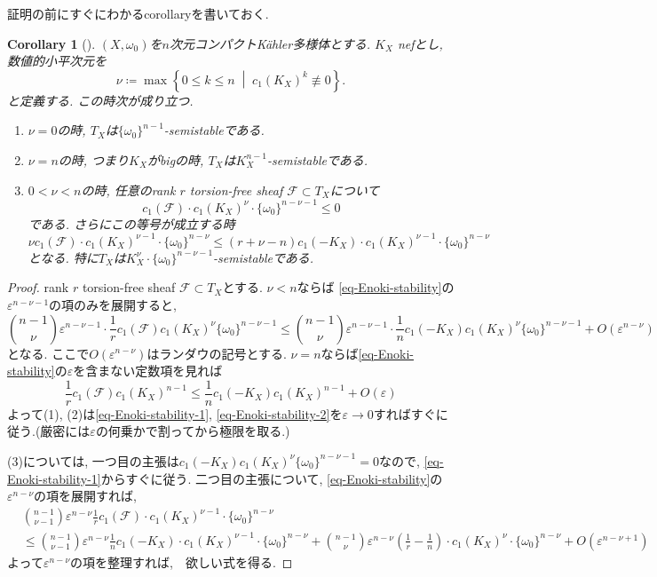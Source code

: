 \documentclass[dvipdfmx,a4paper,11pt]{article} %
\newtheorem{cor}[thm]{Corollary}
\theoremstyle{definition}
\theoremstyle{remark}
\numberwithin{equation}{section}
\begin{document}
証明の前にすぐにわかるcorollaryを書いておく.
\begin{cor}[{\cite[Corollary 1.2, 1.3]{Eno88}}]
$(X, \omega_0)$を$n$次元コンパクトK\"ahler多様体とする. $K_X$ nefとし, 数値的小平次元を
\[
\nu \coloneqq  \max \left\{ 0 \leq k \leq n\;\middle\vert\; c_1(K_X)^k \not \equiv 0 \right\}.
\]
と定義する. この時次が成り立つ.
\begin{enumerate}
\item $\nu=0$の時, $T_X$は$\{\omega_0\}^{n-1}$-semistableである. 
\item  $\nu=n$の時, つまり$K_X$がbigの時, $T_X$は$K_X^{n-1}$-semistableである. 
\item $0<\nu<n$の時, 任意のrank $r$ torsion-free sheaf $\mathcal{F} \subset T_X$について
\[
c_1(\mathcal{F}) \cdot c_1(K_X)^{\nu} \cdot \{ \omega_0\}^{n-\nu-1}
\leq 0
\]
である. さらにこの等号が成立する時
\[
\nu  c_1(\mathcal{F}) \cdot c_1(K_X)^{\nu-1} \cdot \{ \omega_0\}^{n-\nu}
\leq 
(r+\nu - n)
c_1(-K_X) \cdot c_1(K_X)^{\nu-1} \cdot \{ \omega_0\}^{n-\nu}
\]
となる. 
特に$T_X$は$K_X^{\nu}\cdot \{ \omega_0\}^{n-\nu-1}$-semistableである. 
\end{enumerate}
\end{cor}
\begin{proof}
rank $r$ torsion-free sheaf $\mathcal{F} \subset T_X$とする. 
$\nu <n$ならば 
 \eqref{eq-Enoki-stability}の$\varepsilon^{n-\nu-1}$の項のみを展開すると,
\begin{equation}
\label{eq-Enoki-stability-1}
\binom{n-1}{\nu}\varepsilon^{n-\nu-1}
\cdot 
\frac{1}{r}
c_1(\mathcal{F}) 
c_1(K_X)^{\nu}
\{ \omega_0\}^{n-\nu-1}
\leq
\binom{n-1}{\nu}\varepsilon^{n-\nu-1}
\cdot 
\frac{1}{n}
c_1(-K_X) c_1(K_X)^{\nu}
\{ \omega_0\}^{n-\nu-1}
+O(\varepsilon^{n-\nu})
\end{equation}
となる. ここで$O(\varepsilon^{n-\nu})$はランダウの記号とする. 
$\nu =n$ならば\eqref{eq-Enoki-stability}の$\varepsilon$を含まない定数項を見れば
\begin{equation}
\label{eq-Enoki-stability-2}
\frac{1}{r}
c_1(\mathcal{F}) 
c_1(K_X)^{n-1}
\leq
\frac{1}{n}
c_1(-K_X) c_1(K_X)^{n-1}
+O(\varepsilon)
\end{equation}
よって(1), (2)は\eqref{eq-Enoki-stability-1}, \eqref{eq-Enoki-stability-2}を$\varepsilon \to 0$すればすぐに従う.(厳密には$\varepsilon$の何乗かで割ってから極限を取る.)

(3)については,  一つ目の主張は$c_1(-K_X) c_1(K_X)^{\nu}
\{ \omega_0\}^{n-\nu-1}=0$なので, \eqref{eq-Enoki-stability-1}からすぐに従う. 
二つ目の主張について, \eqref{eq-Enoki-stability}の$\varepsilon^{n-\nu}$の項を展開すれば, 
\begin{align*}
&
\binom{n-1}{\nu-1}\varepsilon^{n-\nu}
\frac{1}{r}
 c_1(\mathcal{F}) \cdot c_1(K_X)^{\nu-1} \cdot \{ \omega_0\}^{n-\nu}
\\
&\leq
\binom{n-1}{\nu-1}\varepsilon^{n-\nu}\frac{1}{n}
c_1(-K_X) \cdot c_1(K_X)^{\nu-1} \cdot \{ \omega_0\}^{n-\nu}
+
\binom{n-1}{\nu}\varepsilon^{n-\nu}
\left( \frac{1}{r} - \frac{1}{n}\right)
\cdot
c_1(K_X)^{\nu} \cdot \{ \omega_0\}^{n-\nu}
 +O(\varepsilon^{n-\nu+1})
\end{align*}
よって$\varepsilon^{n-\nu}$の項を整理すれば,　欲しい式を得る. 
\end{proof}
\end{document}
